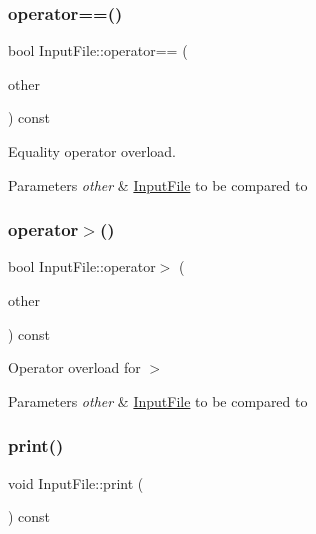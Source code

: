 \subsubsection{\texorpdfstring{operator==()}{operator==()}}
{\footnotesize\ttfamily bool Input\+File\+::operator== (\begin{DoxyParamCaption}\item[{const \hyperlink{class_input_file}{Input\+File} \&}]{other }\end{DoxyParamCaption}) const}



Equality operator overload. 


\begin{DoxyParams}{Parameters}
{\em other} & \hyperlink{class_input_file}{Input\+File} to be compared to \\
\hline
\end{DoxyParams}
\mbox{\label{class_input_file_a4bf7efae68f3f378d1d4d1565fce8081}} 
\subsubsection{\texorpdfstring{operator$>$()}{operator>()}}
{\footnotesize\ttfamily bool Input\+File\+::operator$>$ (\begin{DoxyParamCaption}\item[{const \hyperlink{class_input_file}{Input\+File} \&}]{other }\end{DoxyParamCaption}) const}



Operator overload for $>$ 


\begin{DoxyParams}{Parameters}
{\em other} & \hyperlink{class_input_file}{Input\+File} to be compared to \\
\hline
\end{DoxyParams}
\mbox{\label{class_input_file_a7a27c978d7aebf861360c642ddb47ef5}} 
\subsubsection{\texorpdfstring{print()}{print()}}
{\footnotesize\ttfamily void Input\+File\+::print (\begin{DoxyParamCaption}{ }\end{DoxyParamCaption}) const}



